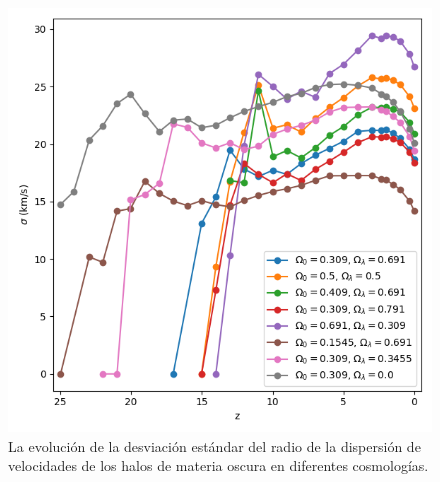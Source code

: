 \documentclass{beamer}
\begin{document}
\begin{frame}
\begin{columns}[t]
			\begin{column}{.5\textwidth}
				\begin{figure}
					\centering
					\includegraphics[scale=0.27]{Conc/VelDisp_Std_Conc.png}
					\caption{\footnotesize La evolución de la desviación estándar del radio de la dispersión de velocidades de los halos de materia oscura en diferentes cosmologías.}
					\label{fig:Conc-VelDispStd}
				\end{figure}
			\end{column}
		\end{columns}

	\end{frame}	

\end{document}
